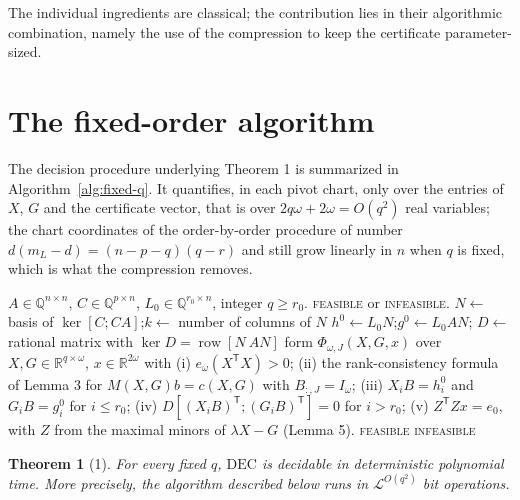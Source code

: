 \documentclass[journal]{IEEEtran}
\theoremstyle{plainn}
\newtheorem*{thm}{Theorem}
\begin{document}
The individual ingredients are classical; the contribution lies in their algorithmic combination, namely the use of the compression to keep the certificate parameter-sized.



\section{The fixed-order algorithm}\label{sec:fixedq}
The decision procedure underlying Theorem 1 is summarized in
Algorithm~\ref{alg:fixed-q}. It quantifies, in each pivot chart, only over the entries of
$X$, $G$ and the certificate vector, that is over $2q\omega+2\omega=O(q^2)$ real variables;
the chart coordinates of the order-by-order procedure of \cite{fer26b} number
$d(m_L-d)=(n-p-q)(q-r)$ and still grow linearly in $n$ when $q$ is fixed, which is what the
compression removes.

\begin{algorithm}[!t]
\caption{Deciding $\mathrm{DEC}(q)$ for a fixed order $q$}
\label{alg:fixed-q}
\begin{algorithmic}[1]
\Require $A\in\mathbb Q^{n\times n}$, $C\in\mathbb Q^{p\times n}$,
$L_0\in\mathbb Q^{r_0\times n}$, integer $q\ge r_0$.
\Ensure \textsc{feasible} or \textsc{infeasible}.
\State $N\gets$ basis of $\ker[C;CA]$;\quad $k\gets$ number of columns of $N$
\State $h^0\gets L_0N$;\quad $g^0\gets L_0AN$;\quad
$D\gets$ rational matrix with $\ker D=\operatorname{row}[N\ AN]$
    \State form $\Phi_{\omega,J}(X,G,x)$ over $X,G\in\mathbb R^{q\times\omega}$,
           $x\in\mathbb R^{2\omega}$ with
    \Statex \quad (i) $e_\omega(X^{\mathsf T}X)>0$;
    \Statex \quad (ii) the rank-consistency formula of Lemma 3 for
           $M(X,G)b=c(X,G)$ with $B_{:,J}=I_\omega$;
    \Statex \quad (iii) $X_iB=h_i^0$ and $G_iB=g_i^0$ for $i\le r_0$;
    \Statex \quad (iv) $D[(X_iB)^{\mathsf T};(G_iB)^{\mathsf T}]=0$ for $i>r_0$;
    \Statex \quad (v) $Z^{\mathsf T}Zx=e_0$, with $Z$ from the maximal minors of
           $\lambda X-G$ (Lemma 5).
      \State \Return \textsc{feasible}
    \EndIf
  \EndFor
\EndFor
\State \Return \textsc{infeasible}
\end{algorithmic}
\end{algorithm}

\begin{thm}[1] For every fixed $q$, $\mathrm{DEC}$ is decidable in deterministic polynomial time. More precisely, the algorithm described below runs in $\mathcal L^{O(q^2)}$
bit operations.
\end{thm}
\end{document}
